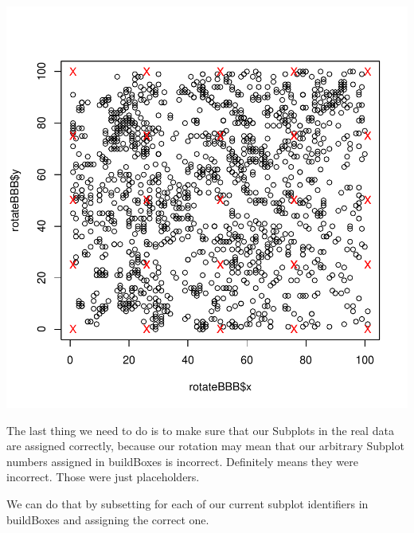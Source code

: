 \documentclass{article}
\begin{document}
\includegraphics{SubPlotBoundaries-003}

The last thing we need to do is to make sure that our Subplots in the real data are assigned correctly, because our rotation may mean that our arbitrary Subplot numbers assigned in buildBoxes is incorrect. Definitely means they were incorrect. Those were just placeholders.

We can do that by subsetting for each of our current subplot identifiers in buildBoxes and assigning the correct one.
\end{document}
